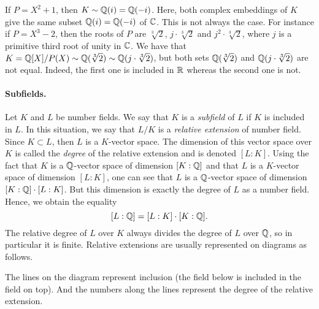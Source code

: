 \begin{example}
If $P = X^2+1$, then $K \sim \mathbb{Q}(i) = \mathbb{Q}(-i)$. Here, both complex embeddings of $K$ give the same subset $\mathbb{Q}(i) = \mathbb{Q}(-i)$ of $\mathbb{C}$. This is not always the case. For instance if $P = X^3-2$, then the roots of $P$ are $\sqrt[3]{2}$, $j \cdot \sqrt[3]{2}$ and $j^2 \cdot \sqrt[3]{2}$, where $j$ is a primitive third root of unity in $\mathbb{C}$. We have that $K = \mathbb{Q}[X]/P(X) \sim \mathbb{Q}(\sqrt[3]{2}) \sim \mathbb{Q}(j \cdot \sqrt[3]{2})$, but both sets $\mathbb{Q}(\sqrt[3]{2})$ and $\mathbb{Q}(j \cdot \sqrt[3]{2})$ are not equal. Indeed, the first one is included in $\mathbb{R}$ whereas the second one is not.
\end{example}

\paragraph{Subfields.} Let $K$ and $L$ be number fields. We say that $K$ is a \emph{subfield} of $L$ if $K$ is included in $L$. In this situation, we say that $L/K$ is a \emph{relative extension} of number field. Since $K \subset L$, then $L$ is a $K$-vector space. The dimension of this vector space over $K$ is called the \emph{degree} of the relative extension and is denoted $[L:K]$.
Using the fact that $K$ is a $\mathbb{Q}$-vector space of dimension $[K:\mathbb{Q}]$ and that $L$ is a $K$-vector space of dimension $[L:K]$, one can see that $L$ is a $\mathbb{Q}$-vector space of dimension $[K:\mathbb{Q}] \cdot [L:K]$. But this dimension is exactly the degree of $L$ as a number field. Hence, we obtain the equality
\[ [L:\mathbb{Q}] = [L:K] \cdot [K:\mathbb{Q}].\]
The relative degree of $L$ over $K$ always divides the degree of $L$ over $\mathbb{Q}$, so in particular it is finite. Relative extensions are usually represented on diagrams as follows.

\begin{center}
\end{center}
The lines on the diagram represent inclusion (the field below is included in the field on top). And the numbers along the lines represent the degree of the relative extension.

